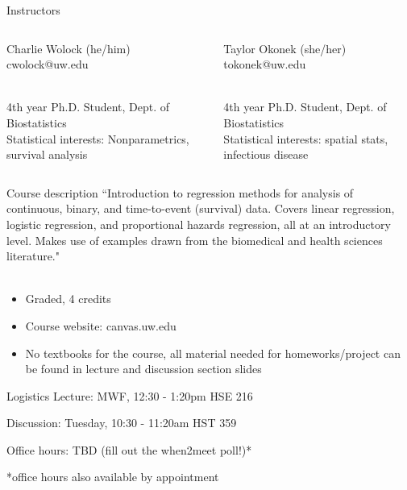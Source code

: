 \documentclass[10pt,t]{beamer}
\begin{document}
\begin{frame}{Instructors}
\begin{columns}
	\begin{column}[t]{0.4\textwidth}
            \small Charlie Wolock (he/him) \\ 
            cwolock@uw.edu \\~\
            
            \small 4th year Ph.D. Student, Dept. of Biostatistics \\
            \small Statistical interests: Nonparametrics, survival analysis
	\end{column}
	\begin{column}[t]{0.4\textwidth}  %
			\small Taylor Okonek (she/her) \\
			tokonek@uw.edu  \\~\ 
			
			\small 4th year Ph.D. Student, Dept. of Biostatistics \\
			\small Statistical interests: spatial stats, infectious disease
	\end{column}
\end{columns}

\end{frame}

\begin{frame}{Course description}
``Introduction to regression methods for analysis of continuous, binary, and time-to-event (survival) data. Covers linear regression, logistic regression, and proportional hazards regression, all at an introductory level. Makes use of examples drawn from the biomedical and health sciences literature." \\~\

\begin{itemize}
	\item Graded, 4 credits
	\item Course website: canvas.uw.edu
	\item No textbooks for the course, all material needed for homeworks/project can be found in lecture and discussion section slides
\end{itemize}

\end{frame}

\begin{frame}{Logistics}
Lecture: MWF, 12:30 - 1:20pm {\hfill HSE 216}

\vspace{0.3cm}

Discussion: Tuesday, 10:30 - 11:20am  {\hfill HST 359}

\vspace{0.3cm}

Office hours: TBD (fill out the when2meet poll!)*

\vspace{0.3cm}

*office hours also available by appointment
\end{frame}
\end{document}

